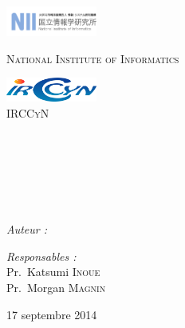 
\begin{titlepage}

\begin{center}

\begin{minipage}[t]{0.48\textwidth}
  \begin{flushleft}
    \includegraphics [width=30mm]{images/logo_NII.jpg} \\[0.5cm]
    \begin{spacing}{1.5}
      \textsc{\LARGE National Institute of Informatics}
    \end{spacing}
  \end{flushleft}
\end{minipage}
\begin{minipage}[t]{0.48\textwidth}
  \begin{flushright}
    \includegraphics [width=30mm]{images/logo_irccyn.png} \\[0.5cm]
    \textsc{\LARGE IRCCyN}
  \end{flushright}
\end{minipage} \\[1.5cm]

\textsc{\Large \reportsubject}\\[0.5cm]
\HRule \\[0.4cm]
{\huge \bfseries \reporttitle}\\[0.4cm]
\HRule \\[1.5cm]

\begin{minipage}[t]{0.3\textwidth}
  \begin{flushleft} \large
    \emph{Auteur :}\\
    \reportauthor
  \end{flushleft}
\end{minipage}
\begin{minipage}[t]{0.6\textwidth}
  \begin{flushright} \large
    \emph{Responsables :} \\
    Pr.~Katsumi \textsc{Inoue} \\
    Pr.~Morgan \textsc{Magnin}
  \end{flushright}
\end{minipage}

\vfill

{\large 17 septembre 2014}

\end{center}

\end{titlepage}
